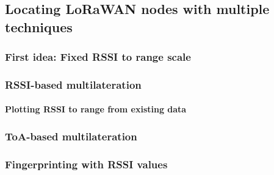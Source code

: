 
\subsection{Locating \acs{LoRaWAN} nodes with multiple techniques}

\subsubsection{First idea: Fixed \ac{RSSI} to range scale}

\subsubsection{\ac{RSSI}-based multilateration}

\paragraph{Plotting \ac{RSSI} to range from existing data}


\subsubsection{\ac{ToA}-based multilateration}


\subsubsection{Fingerprinting with \ac{RSSI} values}

